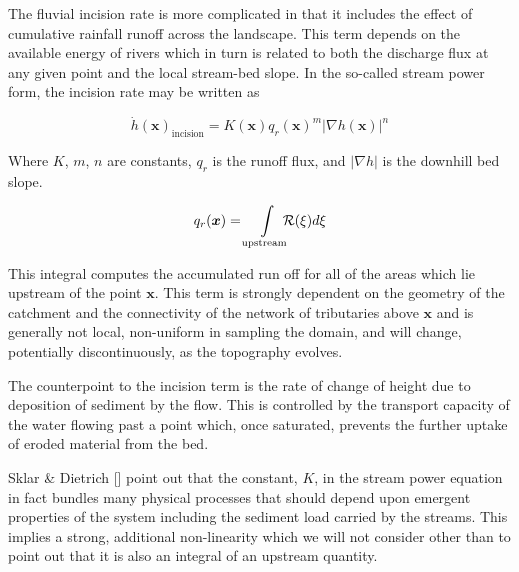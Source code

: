 \documentclass[draft,jgrga]{agu_template/AGUTeX}
\begin{document}
The fluvial incision rate is more complicated in that it includes the effect of cumulative rainfall runoff across the landscape. This term depends on the available energy of rivers which in turn is related to both the discharge flux at any given point and the local stream-bed slope. In the so-called stream power form, the incision rate may be written as

	\begin{equation}
		\dot{h}(\bm{x})_\textrm{incision} =
				K(\bm{x}) q_r(\bm{x})^m \left| \nabla h(\bm{x}) \right|^n
	\end{equation}

Where $K$, $m$, $n$ are constants, $q_r$ is the runoff flux, and $\left| \nabla h \right|$ is the downhill bed slope.

	\begin{equation}
		q_r(\bm{x}) = \int\displaylimits_{\textrm{upstream}} \!\!\!\! {\cal R} (\xi) d \xi
	\end{equation}

\noindent
This integral computes the accumulated run off for all of the areas which lie upstream of the point $\bm{x}$. This term is strongly dependent on the geometry of the catchment and the connectivity of the network of tributaries above $\bm{x}$ and is generally not local, non-uniform in sampling the domain, and will change, potentially discontinuously, as the topography evolves.






The counterpoint to the incision term is the rate of change of height due to deposition of sediment by the flow. This is controlled by the transport capacity of the water flowing past a point which, once saturated, prevents the further uptake of eroded material from the bed.


Sklar \& Dietrich [] point out that the constant, $K$, in the stream power equation in fact bundles many physical processes that should depend upon emergent properties of the system including the sediment load carried by the streams. This implies a strong, additional non-linearity which we will not consider other than to point out that it is also an integral of an upstream quantity.
\end{document}
